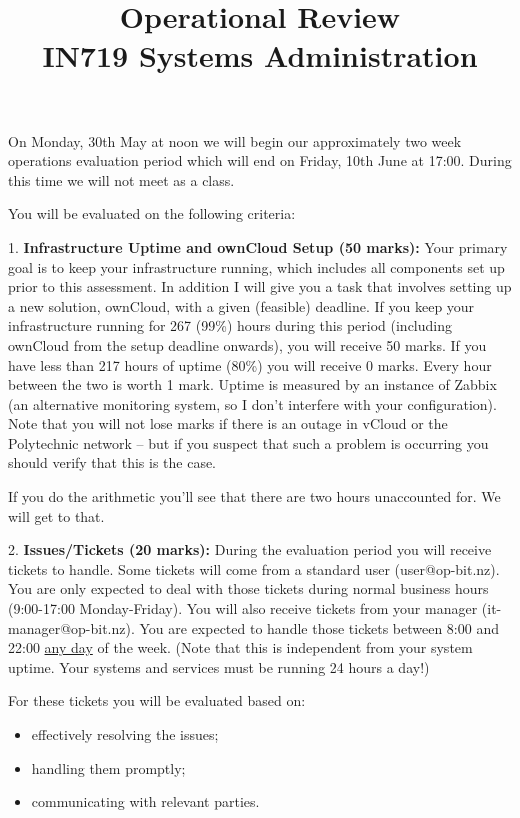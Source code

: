 \documentclass{article}   	%
\title{Operational Review\\ IN719 Systems Administration}
\date{}							%
\begin{document}
\maketitle


On Monday, 30th May at noon we will begin our approximately two week operations evaluation period which will end on Friday, 10th June at 17:00.  During this time we will not meet as a class.

You will be evaluated on the following criteria:

\vspace{0.5cm}

1.  \textbf{Infrastructure Uptime and ownCloud Setup (50 marks):}  Your primary goal is to keep your infrastructure running, which includes all components set up prior to this assessment. In addition I will give you a task that involves setting up a new solution, ownCloud, with a given (feasible) deadline.  If you keep your infrastructure running for 267 (99\%) hours during this period (including ownCloud from the setup deadline onwards), you will receive 50 marks.  If you have less than 217 hours of uptime (80\%) you will receive 0 marks.  Every hour between the two is worth 1 mark.  Uptime is measured by an instance of Zabbix (an alternative monitoring system, so I don't interfere with your configuration).  Note that you will not lose marks if there is an outage in vCloud or the Polytechnic network -- but if you suspect that such a problem is occurring you should verify that this is the case.

If you do the arithmetic you'll see that there are two hours unaccounted for.  We will get to that.

\vspace{0.5cm}

2.  \textbf{Issues/Tickets (20 marks):}  During the evaluation period you will receive tickets to handle.  Some tickets will come from a standard user (user@op-bit.nz).  You are only expected to deal with those tickets during normal business hours (9:00-17:00 Monday-Friday).  You will also receive tickets from your manager (it-manager@op-bit.nz).  You are expected to handle those tickets between 8:00 and 22:00 \underline{any day} of the week. (Note that this is independent from your system uptime. Your systems and services must be running 24 hours a day!) 

For these tickets you will be evaluated based on:

\begin{itemize}
\item effectively resolving the issues;
\item handling them promptly;
\item communicating with relevant parties.
\end{itemize}
\end{document}

